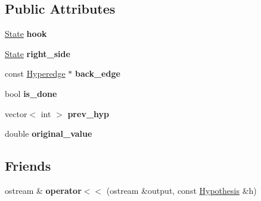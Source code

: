 \subsection*{Public Attributes}
\begin{DoxyCompactItemize}
\item 
\hypertarget{struct_scarab_1_1_h_g_1_1_hypothesis_a53277642394df6145ea8bfc6a3e3996e}{
\hyperlink{struct_scarab_1_1_h_g_1_1_state}{State} {\bfseries hook}}
\label{struct_scarab_1_1_h_g_1_1_hypothesis_a53277642394df6145ea8bfc6a3e3996e}

\item 
\hypertarget{struct_scarab_1_1_h_g_1_1_hypothesis_aff1779905d4f7e9a21b71a20cec4f02d}{
\hyperlink{struct_scarab_1_1_h_g_1_1_state}{State} {\bfseries right\_\-side}}
\label{struct_scarab_1_1_h_g_1_1_hypothesis_aff1779905d4f7e9a21b71a20cec4f02d}

\item 
\hypertarget{struct_scarab_1_1_h_g_1_1_hypothesis_aa31a2d052ecaffa034d8447de748946f}{
const \hyperlink{class_scarab_1_1_h_g_1_1_hyperedge}{Hyperedge} $\ast$ {\bfseries back\_\-edge}}
\label{struct_scarab_1_1_h_g_1_1_hypothesis_aa31a2d052ecaffa034d8447de748946f}

\item 
\hypertarget{struct_scarab_1_1_h_g_1_1_hypothesis_a38b1068d18fe3ce28d6c93e5d12b2225}{
bool {\bfseries is\_\-done}}
\label{struct_scarab_1_1_h_g_1_1_hypothesis_a38b1068d18fe3ce28d6c93e5d12b2225}

\item 
\hypertarget{struct_scarab_1_1_h_g_1_1_hypothesis_a93bf33767cecd362e8a12d385c94be1a}{
vector$<$ int $>$ {\bfseries prev\_\-hyp}}
\label{struct_scarab_1_1_h_g_1_1_hypothesis_a93bf33767cecd362e8a12d385c94be1a}

\item 
\hypertarget{struct_scarab_1_1_h_g_1_1_hypothesis_a95df46740f1263062f4898db1b39cd41}{
double {\bfseries original\_\-value}}
\label{struct_scarab_1_1_h_g_1_1_hypothesis_a95df46740f1263062f4898db1b39cd41}

\end{DoxyCompactItemize}
\subsection*{Friends}
\begin{DoxyCompactItemize}
\item 
\hypertarget{struct_scarab_1_1_h_g_1_1_hypothesis_a70fdb92646880290a9c906e5018c11bb}{
ostream \& {\bfseries operator$<$$<$} (ostream \&output, const \hyperlink{struct_scarab_1_1_h_g_1_1_hypothesis}{Hypothesis} \&h)}
\label{struct_scarab_1_1_h_g_1_1_hypothesis_a70fdb92646880290a9c906e5018c11bb}

\end{DoxyCompactItemize}



